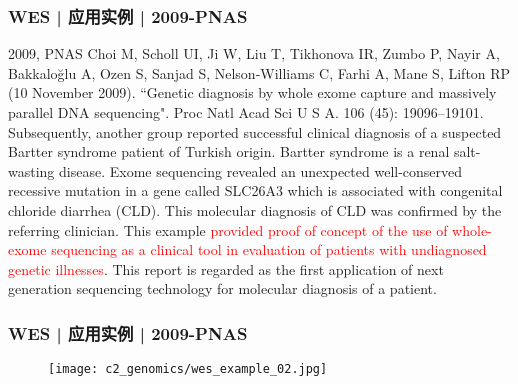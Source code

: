\begin{frame}
  \frametitle{WES | 应用实例 | 2009-PNAS}
  \footnotesize{
  \begin{block}{2009, PNAS}
  Choi M, Scholl UI, Ji W, Liu T, Tikhonova IR, Zumbo P, Nayir A, Bakkaloğlu A, Ozen S, Sanjad S, Nelson-Williams C, Farhi A, Mane S, Lifton RP (10 November 2009). ``Genetic diagnosis by whole exome capture and massively parallel DNA sequencing". Proc Natl Acad Sci U S A. 106 (45): 19096–19101.\\
  \vspace{1em}
  Subsequently, another group reported successful clinical diagnosis of a suspected Bartter syndrome patient of Turkish origin. Bartter syndrome is a renal salt-wasting disease. Exome sequencing revealed an unexpected well-conserved recessive mutation in a gene called SLC26A3 which is associated with congenital chloride diarrhea (CLD). This molecular diagnosis of CLD was confirmed by the referring clinician. This example \textcolor{red}{provided proof of concept of the use of whole-exome sequencing as a clinical tool in evaluation of patients with undiagnosed genetic illnesses}. This report is regarded as the first application of next generation sequencing technology for molecular diagnosis of a patient.
  \end{block}
}
\end{frame}

\begin{frame}
  \frametitle{WES | 应用实例 | 2009-PNAS}
  \begin{figure}
    \centering
    \texttt{[image: c2\_genomics/wes\_example\_02.jpg]}
  \end{figure}
\end{frame}

